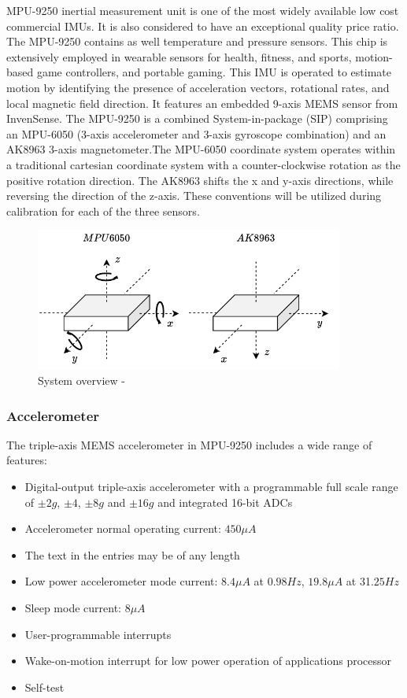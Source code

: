 MPU-9250 inertial measurement unit is one of the most widely available low cost commercial IMUs. It is also considered to have an exceptional quality price ratio. The MPU-9250 contains as well temperature and pressure sensors. This chip is extensively employed in wearable sensors for health, fitness, and sports, motion-based game controllers, and portable gaming. This IMU is operated to estimate motion by identifying the presence of acceleration vectors, rotational rates, and local magnetic field direction. It features an embedded 9-axis MEMS sensor from InvenSense. The MPU-9250 is a combined System-in-package (SIP) comprising an MPU-6050 (3-axis accelerometer and 3-axis gyroscope combination) and an AK8963 3-axis magnetometer.The MPU-6050 coordinate system operates within a traditional cartesian coordinate system with a counter-clockwise rotation as the positive rotation direction. The AK8963 shifts the x and y-axis directions, while reversing the direction of the z-axis. These conventions will be utilized during calibration for each of the three sensors.

\begin{figure}[!h]
    \centering
    \includegraphics[width=0.9\textwidth]{figures/mpu_orientation.pdf}
    \caption{System overview - }
    \label{fig:mpu_orientation}
\end{figure}

\subsubsection{Accelerometer}

The triple-axis MEMS accelerometer in MPU-9250 includes a wide range of features:

\begin{itemize}
    \item Digital-output triple-axis accelerometer with a programmable full scale range  of $\pm 2g$, $\pm 4$, $\pm 8g$ and $\pm 16g$ and integrated 16-bit ADCs
    \item Accelerometer normal operating current: $450 \mu A$
    \item The text in the entries may be of any length
    \item Low power accelerometer mode current: $8.4 \mu A$ at $0.98Hz$, $19.8 \mu A$ at 31.$25Hz$
    \item Sleep mode current: $8 \mu A$
    \item User-programmable interrupts
    \item Wake-on-motion interrupt for low power operation of applications processor
    \item Self-test
\end{itemize}


